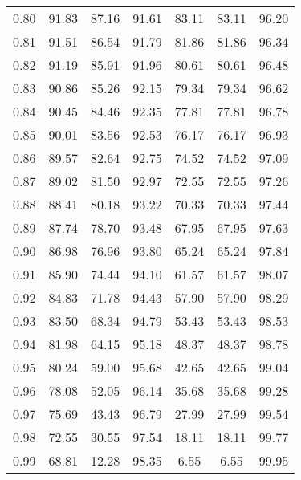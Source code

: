 \begin{tabular}{|c|c|c|c|c|c|c|}
      0.80 &     91.83 &     87.16 &      91.61 &   83.11 &      83.11 &         96.20 \\
      0.81 &     91.51 &     86.54 &      91.79 &   81.86 &      81.86 &         96.34 \\
      0.82 &     91.19 &     85.91 &      91.96 &   80.61 &      80.61 &         96.48 \\
      0.83 &     90.86 &     85.26 &      92.15 &   79.34 &      79.34 &         96.62 \\
      0.84 &     90.45 &     84.46 &      92.35 &   77.81 &      77.81 &         96.78 \\
      0.85 &     90.01 &     83.56 &      92.53 &   76.17 &      76.17 &         96.93 \\
      0.86 &     89.57 &     82.64 &      92.75 &   74.52 &      74.52 &         97.09 \\
      0.87 &     89.02 &     81.50 &      92.97 &   72.55 &      72.55 &         97.26 \\
      0.88 &     88.41 &     80.18 &      93.22 &   70.33 &      70.33 &         97.44 \\
      0.89 &     87.74 &     78.70 &      93.48 &   67.95 &      67.95 &         97.63 \\
      0.90 &     86.98 &     76.96 &      93.80 &   65.24 &      65.24 &         97.84 \\
      0.91 &     85.90 &     74.44 &      94.10 &   61.57 &      61.57 &         98.07 \\
      0.92 &     84.83 &     71.78 &      94.43 &   57.90 &      57.90 &         98.29 \\
      0.93 &     83.50 &     68.34 &      94.79 &   53.43 &      53.43 &         98.53 \\
      0.94 &     81.98 &     64.15 &      95.18 &   48.37 &      48.37 &         98.78 \\
      0.95 &     80.24 &     59.00 &      95.68 &   42.65 &      42.65 &         99.04 \\
      0.96 &     78.08 &     52.05 &      96.14 &   35.68 &      35.68 &         99.28 \\
      0.97 &     75.69 &     43.43 &      96.79 &   27.99 &      27.99 &         99.54 \\
      0.98 &     72.55 &     30.55 &      97.54 &   18.11 &      18.11 &         99.77 \\
      0.99 &     68.81 &     12.28 &      98.35 &    6.55 &       6.55 &         99.95 \\
\bottomrule
\end{tabular}
